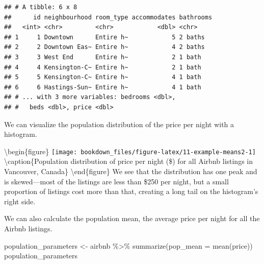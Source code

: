 \documentclass[
]{krantz}
\makeatletter
\newenvironment{Shaded}{\begin{snugshade}}{\end{snugshade}}
\newcommand{\AttributeTok}[1]{\textcolor[rgb]{0.61,0.61,0.61}{#1}}
\newcommand{\FunctionTok}[1]{\textcolor[rgb]{0,0,0}{#1}}
\newcommand{\NormalTok}[1]{#1}
\newcommand{\OtherTok}[1]{\textcolor[rgb]{0.37,0.37,0.37}{#1}}
\newcommand{\SpecialCharTok}[1]{\textcolor[rgb]{0,0,0}{#1}}
\newcommand{\StringTok}[1]{\textcolor[rgb]{0.5,0.5,0.5}{#1}}
\newenvironment{kframe}{%
\medskip{}
\setlength{\fboxsep}{.8em}
 \def\at@end@of@kframe{}%
 \ifinner\ifhmode%
  \def\at@end@of@kframe{\end{minipage}}%
  \begin{minipage}{\columnwidth}%
 \fi\fi%
 \def\FrameCommand##1{\hskip\@totalleftmargin \hskip-\fboxsep
 \colorbox{shadecolor}{##1}\hskip-\fboxsep
     \hskip-\linewidth \hskip-\@totalleftmargin \hskip\columnwidth}%
 \MakeFramed {\advance\hsize-\width
   \@totalleftmargin\z@ \linewidth\hsize
   \@setminipage}}%
 {\par\unskip\endMakeFramed%
 \at@end@of@kframe}
\renewenvironment{Shaded}{\begin{kframe}}{\end{kframe}}
\makeatother
\begin{document}
\begin{verbatim}
## # A tibble: 6 x 8
##      id neighbourhood room_type accommodates bathrooms
##   <int> <chr>         <chr>            <dbl> <chr>    
## 1     1 Downtown      Entire h~            5 2 baths  
## 2     2 Downtown Eas~ Entire h~            4 2 baths  
## 3     3 West End      Entire h~            2 1 bath   
## 4     4 Kensington-C~ Entire h~            2 1 bath   
## 5     5 Kensington-C~ Entire h~            4 1 bath   
## 6     6 Hastings-Sun~ Entire h~            4 1 bath   
## # ... with 3 more variables: bedrooms <dbl>,
## #   beds <dbl>, price <dbl>
\end{verbatim}

We can visualize the population distribution of the price per night with a histogram.

\begin{Shaded}
\end{Shaded}

\textbackslash begin\{figure\}
\texttt{[image: bookdown\_files/figure-latex/11-example-means2-1]} \textbackslash caption\{Population distribution of price per night (\$) for all Airbnb listings in Vancouver, Canada\}\label{fig:11-example-means2}
\textbackslash end\{figure\}
We see that the distribution has one peak and is skewed---most of the listings
are less than \$250 per night, but a small proportion of listings cost more
than that, creating a long tail on the histogram's right side.

We can also calculate the population mean, the average price per night for all the Airbnb listings.

\begin{Shaded}
\begin{Highlighting}[]
\NormalTok{population\_parameters }\OtherTok{\textless{}{-}}\NormalTok{ airbnb }\SpecialCharTok{\%\textgreater{}\%}
  \FunctionTok{summarize}\NormalTok{(}\AttributeTok{pop\_mean =} \FunctionTok{mean}\NormalTok{(price))}
\NormalTok{population\_parameters}
\end{Highlighting}
\end{Shaded}
\end{document}
